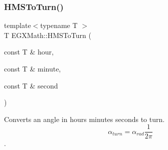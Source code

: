 \subsubsection{\texorpdfstring{H\+M\+S\+To\+Turn()}{HMSToTurn()}}
{\footnotesize\ttfamily template$<$typename T $>$ \\
T E\+G\+X\+Math\+::\+H\+M\+S\+To\+Turn (\begin{DoxyParamCaption}\item[{const T \&}]{hour,  }\item[{const T \&}]{minute,  }\item[{const T \&}]{second }\end{DoxyParamCaption})}



Converts an angle in hours minutes seconds to turn. \[\alpha_{turn}=\alpha_{rad}\frac{1}{2 \pi}\]. 

